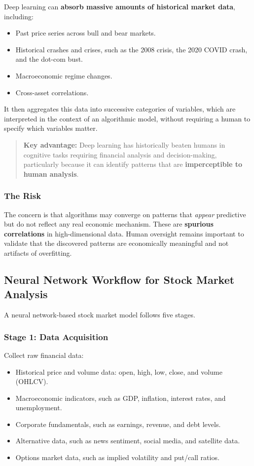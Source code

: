 \documentclass[12pt,openany]{book}
\begin{document}
Deep learning can \textbf{absorb massive amounts of historical market data}, including:
\begin{itemize}[leftmargin=*]
    \item Past price series across bull and bear markets.
    \item Historical crashes and crises, such as the 2008 crisis, the 2020 COVID crash, and the dot-com bust.
    \item Macroeconomic regime changes.
    \item Cross-asset correlations.
\end{itemize}

It then aggregates this data into successive categories of variables, which are interpreted in the context of an algorithmic model, without requiring a human to specify which variables matter.

\begin{quote}
\textbf{Key advantage:} Deep learning has historically beaten humans in cognitive tasks requiring financial analysis and decision-making, particularly because it can identify patterns that are \textbf{imperceptible to human analysis}.
\end{quote}

\subsubsection{The Risk}

The concern is that algorithms may converge on patterns that \textit{appear} predictive but do not reflect any real economic mechanism. These are \textbf{spurious correlations} in high-dimensional data. Human oversight remains important to validate that the discovered patterns are economically meaningful and not artifacts of overfitting.

\subsection{Neural Network Workflow for Stock Market Analysis}

A neural network-based stock market model follows five stages.

\subsubsection{Stage 1: Data Acquisition}

Collect raw financial data:
\begin{itemize}[leftmargin=*]
    \item Historical price and volume data: open, high, low, close, and volume (OHLCV).
    \item Macroeconomic indicators, such as GDP, inflation, interest rates, and unemployment.
    \item Corporate fundamentals, such as earnings, revenue, and debt levels.
    \item Alternative data, such as news sentiment, social media, and satellite data.
    \item Options market data, such as implied volatility and put/call ratios.
\end{itemize}
\end{document}
